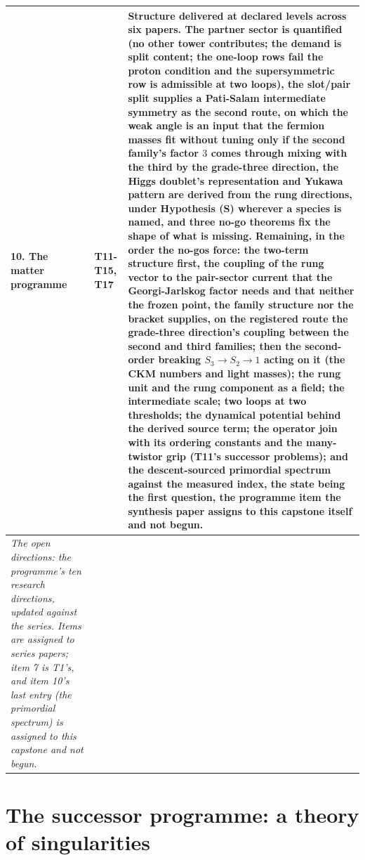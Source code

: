 \documentclass[11pt]{article}
\theoremstyle{definition}
\theoremstyle{plain}
\begin{document}
\begin{longtable}{p{} p{} p{}}
10. The matter programme & T11-T15, T17 & Structure delivered at declared levels across six papers. The partner sector is quantified (no other tower contributes; the demand is split content; the one-loop rows fail the proton condition and the supersymmetric row is admissible at two loops), the slot/pair split supplies a Pati-Salam intermediate symmetry as the second route, on which the weak angle is an input that the fermion masses fit without tuning only if the second family's factor $3$ comes through mixing with the third by the grade-three direction, the Higgs doublet's representation and Yukawa pattern are derived from the rung directions, under Hypothesis (S) wherever a species is named, and three no-go theorems fix the shape of what is missing. Remaining, in the order the no-gos force: the two-term structure first, the coupling of the rung vector to the pair-sector current that the Georgi-Jarlskog factor needs and that neither the frozen point, the family structure nor the bracket supplies, on the registered route the grade-three direction's coupling between the second and third families; then the second-order breaking $S_{3} \to S_{2} \to 1$ acting on it (the CKM numbers and light masses); the rung unit and the rung component as a field; the intermediate scale; two loops at two thresholds; the dynamical potential behind the derived source term; the operator join with its ordering constants and the many-twistor grip (T11's successor problems); and the descent-sourced primordial spectrum against the measured index, the state being the first question, the programme item the synthesis paper assigns to this capstone itself and not begun. \\
\bottomrule

\emph{The open directions: the programme's ten research directions, updated against the series. Items are assigned to series papers; item 7 is T1's, and item 10's last entry (the primordial spectrum) is assigned to this capstone and not begun.}

\end{longtable}

\section{The successor programme: a theory of singularities}
\end{document}
